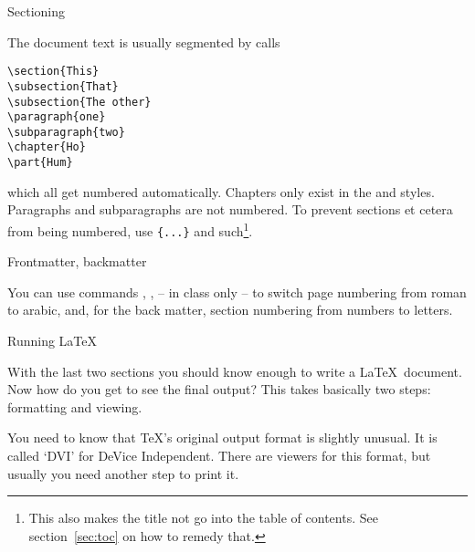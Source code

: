  {Sectioning}
\label{sec:section}

The document text is usually segmented by calls
\begin{verbatim}
\section{This}
\subsection{That}
\subsection{The other}
\paragraph{one}
\subparagraph{two}
\chapter{Ho}
\part{Hum}
\end{verbatim}
which all get numbered automatically. Chapters only exist in the
 and  styles. Paragraphs and subparagraphs are not
numbered. To prevent sections et cetera from being numbered, use
\verb+{...}+ and such\footnote{This also makes the title not
  go into the table of contents. See section~\ref{sec:toc} on how to
  remedy that.}.

 {Frontmatter, backmatter}

You can use commands , ,
 -- in  class only -- to switch page
numbering from roman to arabic, and, for the back matter, section
numbering from numbers to letters.

 {Running \LaTeX}

With the last two sections you should know enough to write a
\LaTeX\ document. Now how do you get to see the final output?
This takes basically two steps: formatting and viewing.

You need to know that \TeX's original output format is slightly
unusual. It is called `DVI' for DeVice
Independent. There are viewers for this format, but usually you need
another step to print it.

